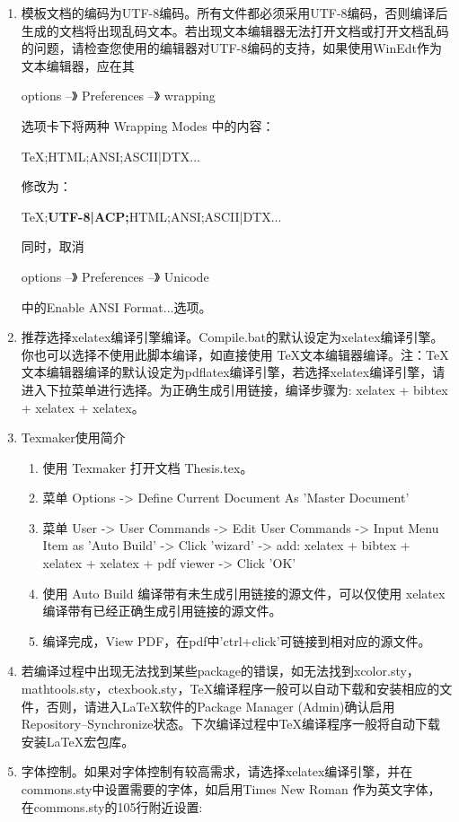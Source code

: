\begin{enumerate}
  \item 模板文档的编码为UTF-8编码。所有文件都必须采用UTF-8编码，否则编译后生成的文档将出现乱码文本。若出现文本编辑器无法打开文档或打开文档乱码的问题，请检查您使用的编辑器对UTF-8编码的支持，如果使用WinEdt作为文本编辑器，应在其

  options --》 Preferences --》 wrapping

  选项卡下将两种 Wrapping Modes 中的内容：

  TeX;HTML;ANSI;ASCII|DTX...

  修改为：

  TeX;\textbf{UTF-8|ACP;}HTML;ANSI;ASCII|DTX...

  同时，取消

  options --》 Preferences --》 Unicode

  中的Enable ANSI Format...选项。
  \item 推荐选择xelatex编译引擎编译。Compile.bat的默认设定为xelatex编译引擎。你也可以选择不使用此脚本编译，如直接使用 \TeX{}文本编辑器编译。注：\TeX{}文本编辑器编译的默认设定为pdflatex编译引擎，若选择xelatex编译引擎，请进入下拉菜单进行选择。为正确生成引用链接，编译步骤为: xelatex + bibtex + xelatex + xelatex。
  \item Texmaker使用简介
      \begin{enumerate}
          \item 使用 Texmaker 打开文档 Thesis.tex。
          \item 菜单 Options -> Define Current Document As 'Master Document'
          \item 菜单 User -> User Commands -> Edit User Commands -> Input Menu Item as 'Auto Build' -> Click 'wizard' -> add: xelatex + bibtex + xelatex + xelatex + pdf viewer -> Click 'OK'
          \item 使用 Auto Build 编译带有未生成引用链接的源文件，可以仅使用 xelatex 编译带有已经正确生成引用链接的源文件。
          \item 编译完成，View PDF，在pdf中'ctrl+click'可链接到相对应的源文件。
      \end{enumerate}
  \item 若编译过程中出现无法找到某些package的错误，如无法找到xcolor.sty，mathtools.sty，ctexbook.sty，\TeX{}编译程序一般可以自动下载和安装相应的文件，否则，请进入\LaTeX{}软件的Package Manager (Admin)确认启用Repository--Synchronize状态。下次编译过程中\TeX{}编译程序一般将自动下载安装\LaTeX{}宏包库。
  \item 字体控制。如果对字体控制有较高需求，请选择xelatex编译引擎，并在commons.sty中设置需要的字体，如启用Times New Roman 作为英文字体，在commons.sty的105行附近设置:


\end{enumerate}
